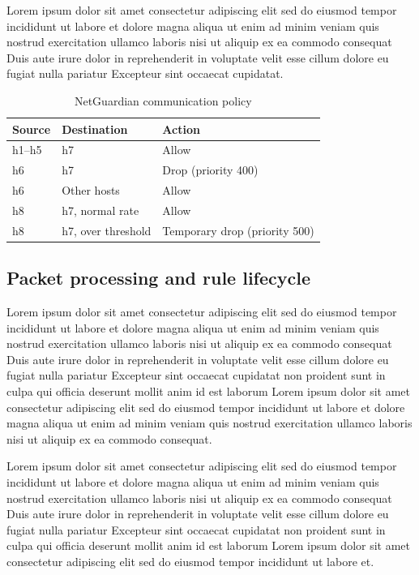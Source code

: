 Lorem ipsum dolor sit amet consectetur adipiscing elit sed do eiusmod tempor incididunt ut labore et dolore magna aliqua ut enim ad minim veniam quis nostrud exercitation ullamco laboris nisi ut aliquip ex ea commodo consequat Duis aute irure dolor in reprehenderit in voluptate velit esse cillum dolore eu fugiat nulla pariatur Excepteur sint occaecat cupidatat.

\begin{table}[t]
\caption{NetGuardian communication policy}
\label{tab:policy}
\centering\small
\begin{tabular}{lll}
\toprule
Source & Destination & Action \\
\midrule
h1--h5 & h7 & Allow \\
h6 & h7 & Drop (priority 400) \\
h6 & Other hosts & Allow \\
h8 & h7, normal rate & Allow \\
h8 & h7, over threshold & Temporary drop (priority 500) \\
\bottomrule
\end{tabular}
\end{table}

\subsection{Packet processing and rule lifecycle}
Lorem ipsum dolor sit amet consectetur adipiscing elit sed do eiusmod tempor incididunt ut labore et dolore magna aliqua ut enim ad minim veniam quis nostrud exercitation ullamco laboris nisi ut aliquip ex ea commodo consequat Duis aute irure dolor in reprehenderit in voluptate velit esse cillum dolore eu fugiat nulla pariatur Excepteur sint occaecat cupidatat non proident sunt in culpa qui officia deserunt mollit anim id est laborum Lorem ipsum dolor sit amet consectetur adipiscing elit sed do eiusmod tempor incididunt ut labore et dolore magna aliqua ut enim ad minim veniam quis nostrud exercitation ullamco laboris nisi ut aliquip ex ea commodo consequat.

Lorem ipsum dolor sit amet consectetur adipiscing elit sed do eiusmod tempor incididunt ut labore et dolore magna aliqua ut enim ad minim veniam quis nostrud exercitation ullamco laboris nisi ut aliquip ex ea commodo consequat Duis aute irure dolor in reprehenderit in voluptate velit esse cillum dolore eu fugiat nulla pariatur Excepteur sint occaecat cupidatat non proident sunt in culpa qui officia deserunt mollit anim id est laborum Lorem ipsum dolor sit amet consectetur adipiscing elit sed do eiusmod tempor incididunt ut labore et.

